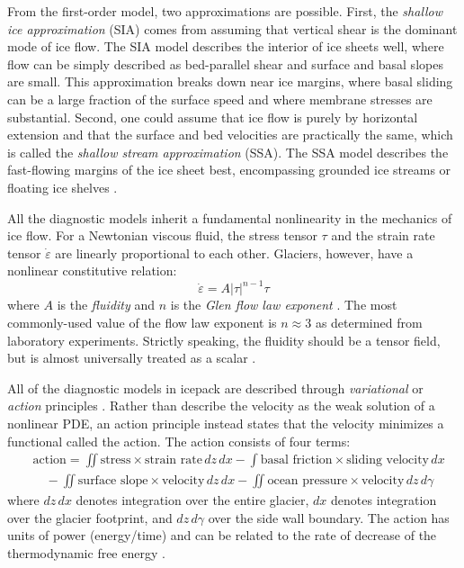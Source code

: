 \documentclass[journal abbreviation, manuscript]{copernicus}
\begin{document}
From the first-order model, two approximations are possible.
First, the \emph{shallow ice approximation} (SIA) comes from assuming that vertical shear is the dominant mode of ice flow.
The SIA model \citep{hutter1981effect} describes the interior of ice sheets well, where flow can be simply described as bed-parallel shear and surface and basal slopes are small.
This approximation breaks down near ice margins, where basal sliding can be a large fraction of the surface speed and where membrane stresses are substantial.
Second, one could assume that ice flow is purely by horizontal extension and that the surface and bed velocities are practically the same, which is called the \emph{shallow stream approximation} (SSA).
The SSA model describes the fast-flowing margins of the ice sheet best, encompassing grounded ice streams or floating ice shelves \citep{macayeal1989large}.

All the diagnostic models inherit a fundamental nonlinearity in the mechanics of ice flow.
For a Newtonian viscous fluid, the stress tensor $\tau$ and the strain rate tensor $\dot\varepsilon$ are linearly proportional to each other.
Glaciers, however, have a nonlinear constitutive relation:
\begin{equation}
    \dot\varepsilon = A|\tau|^{n - 1}\tau
\end{equation}
where $A$ is the \emph{fluidity} and $n$ is the \emph{Glen flow law exponent} \citep{cuffey2010physics}.
The most commonly-used value of the flow law exponent is $n \approx 3$ as determined from laboratory experiments.
Strictly speaking, the fluidity should be a tensor field, but is almost universally treated as a scalar \citep{gillet2006flow}.

All of the diagnostic models in icepack are described through \emph{variational} or \emph{action} principles \citep{dukowicz2010consistent}.
Rather than describe the velocity as the weak solution of a nonlinear PDE, an action principle instead states that the velocity minimizes a functional called the action.
The action consists of four terms:
\begin{align}
    & \text{action} = \iint\text{stress} \times \text{strain rate}\,dz\,dx - \int\text{basal friction} \times \text{sliding velocity}\,dx \nonumber \\
    & \quad - \iint\text{surface slope}\times\text{velocity}\,dz\,dx - \iint\text{ocean pressure}\times\text{velocity}\,dz\,d\gamma
    \label{action-functional}
\end{align}
where $dz\,dx$ denotes integration over the entire glacier, $dx$ denotes integration over the glacier footprint, and $dz\,d\gamma$ over the side wall boundary.
The action has units of power (energy/time) and can be related to the rate of decrease of the thermodynamic free energy \citep{de2013non}.
\end{document}
